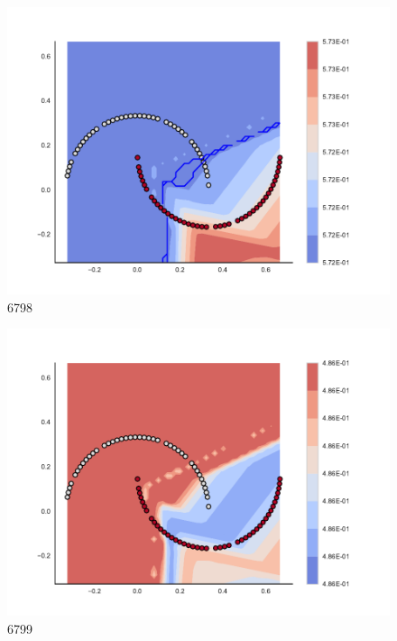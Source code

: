 \begin{subfigure}[b]{0.09\textwidth}
    \includegraphics[clip, trim=2.35cm 1.75cm 4.5cm 0cm,width=\textwidth]{img/convergence/6798.pdf}
    \caption{6798}
    \label{fig:convergence_6798}
\end{subfigure}
%
\begin{subfigure}[b]{0.09\textwidth}
    \includegraphics[clip, trim=2.35cm 1.75cm 4.5cm 0cm,width=\textwidth]{img/convergence/6799.pdf}
    \caption{6799}
    \label{fig:convergence_6799}
\end{subfigure}
%
